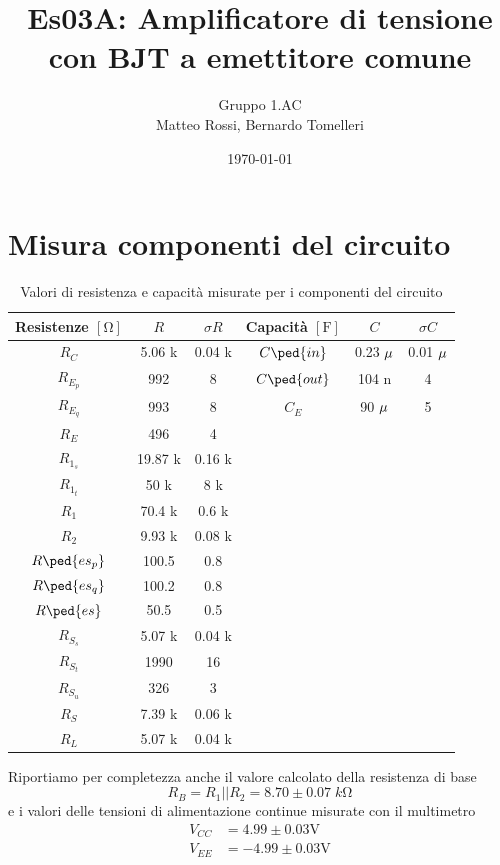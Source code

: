 \documentclass[10pt,a4paper]{article}
\author{Gruppo 1.AC \\ Matteo Rossi, Bernardo Tomelleri}
\title{Es03A: Amplificatore di tensione con BJT a emettitore comune}
\begin{document}
\date{\today}
\maketitle

\setcounter{section}{0}

\section*{Misura componenti del circuito}
\begin{table}[ht]
\centering
\begin{tabular}{cccccc}
\toprule
Resistenze $[\si{\ohm}]$ & $R$ & $\sigma R$ & Capacità $[\si{\F}]$ & $C$ &
$\sigma C$ \\
\midrule
\midrule
$R_C$		  & 5.06 k	& 0.04 k & $C\ped{in}$  & 0.23 $\rm \mu$ & 0.01 $\rm \mu$ \\
$R_{E_p}$	  & 992		& 8      & $C\ped{out}$ & 104 n			 & 4	\\
$R_{E_q}$	  & 993		& 8      & $C_E$        & 90 $\rm \mu$	 & 5	\\
$R_{E}$		  & 496		& 4      &              &				 &		\\
$R_{1_s}$	  & 19.87 k & 0.16 k &              &				 &		\\
$R_{1_t}$	  & 50 k  & 8 k	 &              &				 &		\\
$R_1$		  & 70.4 k  & 0.6 k	 &              &				 &		\\
$R_2$		  & 9.93 k  & 0.08 k &              &				 &		\\
$R\ped{es_p}$ & 100.5	& 0.8    &				&				 &		\\
$R\ped{es_q}$ & 100.2	& 0.8    &				&				 &		\\
$R\ped{es}$   & 50.5	& 0.5    &				&				 &		\\
$R_{S_s}$	  & 5.07 k	& 0.04 k &				&				 &		\\
$R_{S_t}$     & 1990	& 16	 &				&				 &		\\
$R_{S_u}$	  & 326		& 3		 &				&				 &		\\
$R_{S}$		  & 7.39 k	& 0.06 k &				&				 &		\\
$R_{L}$		  & 5.07 k	& 0.04 k &				&				 &		\\
\bottomrule     
\end{tabular}
\caption{Valori di resistenza e capacità misurate per i componenti del
circuito \label{tab: rcmes}}
\end{table}
Riportiamo per completezza anche il valore calcolato della resistenza di base
\[
R_B = R_1 || R_2 = 8.70 \pm 0.07 \; \si{k\ohm}
\]
e i valori delle tensioni di alimentazione continue misurate con il multimetro
\begin{align*}
V_{CC} &= 4.99 \pm 0.03 \si{\V} \\
V_{EE} &= -4.99 \pm 0.03 \si{\V}
\end{align*}
\end{document}
